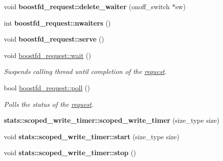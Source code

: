 \begin{CompactItemize}
\item 
\hypertarget{group__iolayer_g1e8576c3e916fbac0ea8c28551c9c4ab}{
void \textbf{boostfd\_\-request::delete\_\-waiter} (onoff\_\-switch $\ast$sw)}
\label{group__iolayer_g1e8576c3e916fbac0ea8c28551c9c4ab}

\item 
\hypertarget{group__iolayer_gf0a44abb0c368e4c859eb8abf48a52d2}{
int \textbf{boostfd\_\-request::nwaiters} ()}
\label{group__iolayer_gf0a44abb0c368e4c859eb8abf48a52d2}

\item 
\hypertarget{group__iolayer_g91d7f4fb290408511cb6d8c9f5156d87}{
void \textbf{boostfd\_\-request::serve} ()}
\label{group__iolayer_g91d7f4fb290408511cb6d8c9f5156d87}

\item 
\hypertarget{group__iolayer_g6e561d1080c80655590c5685f746174f}{
void \hyperlink{group__iolayer_g6e561d1080c80655590c5685f746174f}{boostfd\_\-request::wait} ()}
\label{group__iolayer_g6e561d1080c80655590c5685f746174f}

\begin{CompactList}\small\item\em Suspends calling thread until completion of the \hyperlink{classrequest}{request}. \item\end{CompactList}\item 
bool \hyperlink{group__iolayer_g3ec494e77ffa0621380e54cdc4cda657}{boostfd\_\-request::poll} ()
\begin{CompactList}\small\item\em Polls the status of the \hyperlink{classrequest}{request}. \item\end{CompactList}\item 
\hypertarget{group__iolayer_g229d6d29a9a0153aa7021f6b1f51f01e}{
\textbf{stats::scoped\_\-write\_\-timer::scoped\_\-write\_\-timer} (size\_\-type size)}
\label{group__iolayer_g229d6d29a9a0153aa7021f6b1f51f01e}

\item 
\hypertarget{group__iolayer_g996bc3c04d44761feab6d59302ff0422}{
void \textbf{stats::scoped\_\-write\_\-timer::start} (size\_\-type size)}
\label{group__iolayer_g996bc3c04d44761feab6d59302ff0422}

\item 
\hypertarget{group__iolayer_g3037e82ecab236ec115174aeae8b6859}{
void \textbf{stats::scoped\_\-write\_\-timer::stop} ()}
\label{group__iolayer_g3037e82ecab236ec115174aeae8b6859}


\end{CompactItemize}
